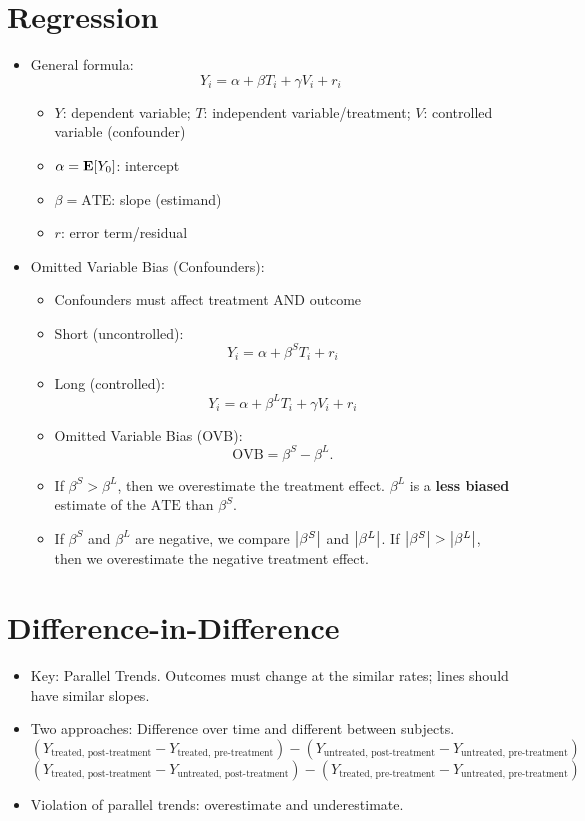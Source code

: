 \documentclass[10pt, letterpaper]{article}
\def\E{\vb{E}}
\def\ATE{\mathrm{ATE}}
\def\OVB{\mathrm{OVB}}
\begin{document}
\section{Regression}
\begin{itemize}
	\item General formula: \[Y_i=\alpha+\beta T_i+\gamma V_i+r_i\]
	\begin{itemize}
		\item $Y$: dependent variable; $T$: independent variable/treatment; $V$: controlled variable (confounder)
		\item $\alpha=\E[Y_0]$: intercept
		\item $\beta=\ATE$: slope (estimand)
		\item $r$: error term/residual
	\end{itemize}
	\item Omitted Variable Bias (Confounders): 
	\begin{itemize}
		\item Confounders must affect treatment AND outcome
		\item Short (uncontrolled): \[Y_i=\alpha+\beta^S T_i+r_i\]
		\item Long (controlled): \[Y_i=\alpha+\beta^L T_i+\gamma V_i+r_i\]
		\item Omitted Variable Bias (OVB): \[\OVB=\beta^S-\beta^L.\]
		\item If $\beta^S>\beta^L$, then we overestimate the treatment effect. $\beta^L$ is a \textbf{less biased} estimate of the $\ATE$ than $\beta^S$.
		\item If $\beta^S$ and $\beta^L$ are negative, we compare $\qty|\beta^S|$ and $\qty|\beta^L|$. If $\qty|\beta^S|>\qty|\beta^L|$, then we overestimate the negative treatment effect.
	\end{itemize}
\end{itemize}

\section{Difference-in-Difference}
\begin{itemize}
	\item Key: Parallel Trends. Outcomes must change at the similar rates; lines should have similar slopes. 
	\item Two approaches: Difference over time and different between subjects. \[(Y_\text{treated, post-treatment}-Y_\text{treated, pre-treatment})-(Y_\text{untreated, post-treatment}-Y_\text{untreated, pre-treatment})\]\[(Y_\text{treated, post-treatment}-Y_\text{untreated, post-treatment})-(Y_\text{treated, pre-treatment}-Y_\text{untreated, pre-treatment})\]
	\item Violation of parallel trends: overestimate and underestimate. 
\end{itemize}
\end{document}
